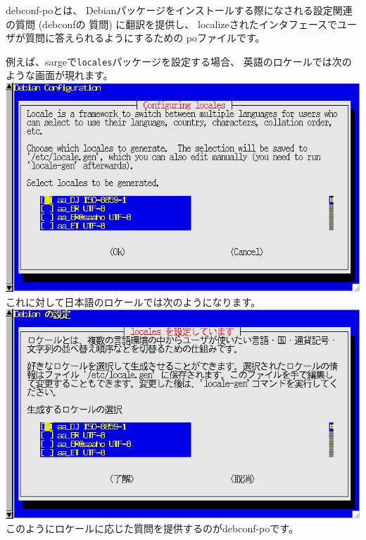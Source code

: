 \documentclass[mingoth,a4paper]{jsarticle}
\begin{document}
debconf-poとは、
Debianパッケージをインストールする際になされる設定関連の質問 (debconfの
質問) に翻訳を提供し、
localizeされたインタフェースでユーザが質問に答えられるようにするための
poファイルです。

例えば、sargeで\texttt{locales}パッケージを設定する場合、
英語のロケールでは次のような画面が現れます。\\
\includegraphics[width=1\hsize]{image200609/debconf-en.png}\\
これに対して日本語のロケールでは次のようになります。\\
\includegraphics[width=1\hsize]{image200609/debconf-ja.png}\\
このようにロケールに応じた質問を提供するのがdebconf-poです。
\end{document}
